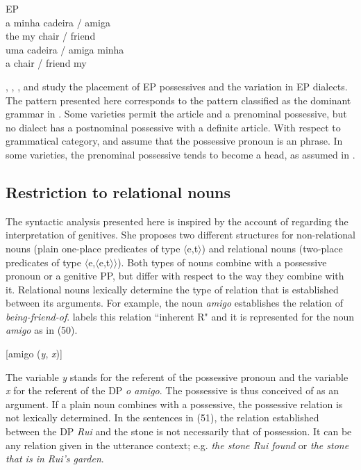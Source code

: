 \documentclass[output=paper]{langsci/langscibook}
\begin{document}
\ea%
         EP\label{ex:wein:49}\\
    \ea  
    \gll a minha cadeira / amiga\\
         the my chair / friend\\
    \ex  
    \gll uma cadeira / amiga minha\\
         a chair / friend my\\
    \z
\z

\citet{Brito2007}, \citet{Castro2003}, \citet{Castro2005,Castro2007}, and \citet{Miguel2002estatuto,Miguel2002para,Miguel2004} study the placement of EP possessives and the variation in EP dialects. The pattern presented here corresponds to the pattern classified as the dominant grammar in \citet{Brito2007}. Some varieties permit the  article and a prenominal possessive, but no dialect has a postnominal possessive with a definite article. With respect to grammatical category, \citet{Brito2007} and \citet{Miguel2002estatuto,Miguel2002para} assume that the possessive pronoun is an  phrase. In some varieties, the prenominal possessive tends to become a  head, as assumed in \citet{Castro2003}.

\subsection{Restriction to relational nouns} %

The syntactic analysis presented here is inspired by the account of \citet{Partee1997} regarding the interpretation of genitives. She proposes two different structures for non-relational nouns (plain one-place predicates of type $\langle$e,t$\rangle$) and relational nouns (two-place predicates of type $\langle$e,$\langle$e,t$\rangle\rangle$). Both types of nouns combine with a possessive pronoun or a genitive PP, but differ with respect to the way they combine with it. Relational nouns lexically determine the type of relation that is established between its arguments. For example, the noun \textit{amigo} establishes the relation of \textit{being-friend-of}. \citet{Partee1997} labels this relation “inherent R" and it is represented for the noun \textit{amigo} as in (50).

\ea%
    \label{ex:wein:50}
    [amigo (\textit{y}, \textit{x})]
    \z


The variable \textit{y} stands for the referent of the possessive pronoun and the variable \textit{x} for the referent of the DP \textit{o amigo}. The possessive is thus conceived of as an argument. If a plain noun combines with a possessive, the possessive relation is not lexically determined. In the sentences in (51), the relation established between the DP \textit{Rui} and the stone is not necessarily that of possession. It can be any relation given in the utterance context; e.g. \textit{the stone Rui found} or \textit{the stone that is in Rui’s garden}.
\end{document}
